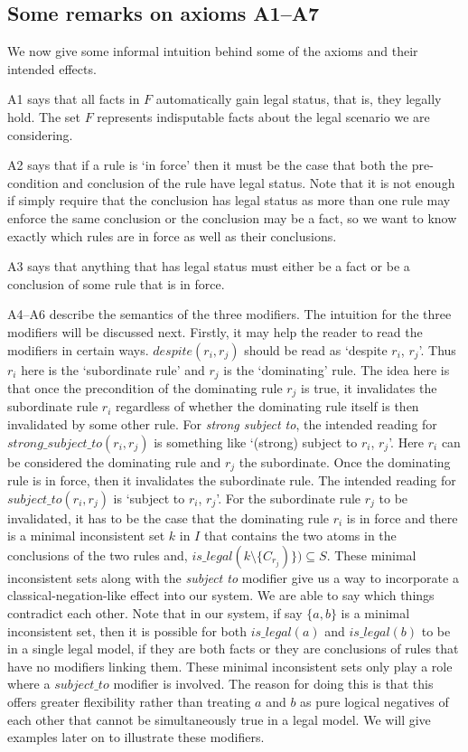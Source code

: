 \subsection{Some remarks on axioms A1--A7}
We now give some informal intuition behind some of the axioms and their intended effects.

A1 says that all facts in $F$ automatically gain legal status, that is, they legally hold. The set $F$ represents indisputable facts about the legal scenario we are considering.

A2 says that if a rule is `in force' then it must be the case that both the pre-condition and conclusion of the rule have legal status. Note that it is not enough if simply require that the conclusion has legal status as more than one rule may enforce the same conclusion or the conclusion may be a fact, so we want to know exactly which rules are in force as well as their conclusions.

A3 says that anything that has legal status must either be a fact or be a conclusion of some rule that is in force.

A4--A6 describe the semantics of the three modifiers. The intuition for the three modifiers will be discussed next. Firstly, it may help the reader to read the modifiers in certain ways. $despite(r_{i},r_{j})$ should be read as `despite $r_{i}$, $r_{j}$'. Thus $r_{i}$ here is the `subordinate rule' and $r_{j}$ is the `dominating' rule. The idea here is that once the precondition of the dominating rule $r_{j}$ is true, it invalidates the subordinate rule $r_{i}$ regardless of whether the dominating rule itself is then invalidated by some other rule. For \textit{strong subject to}, the intended reading for $strong\_subject\_to(r_{i},r_{j})$ is something like `(strong) subject to $r_{i}$, $r_{j}$'. Here $r_{i}$ can be considered the dominating rule and $r_{j}$ the subordinate. Once the dominating rule is in force, then it invalidates the subordinate rule. The intended reading for $subject\_to(r_{i},r_{j})$ is `subject to $r_{i}$, $r_{j}$'. For the subordinate rule $r_{j}$ to be invalidated, it has to be the case that the dominating rule $r_{i}$ is in force and there is a minimal inconsistent set $k$ in $I$ that contains the two atoms in the conclusions of the two rules and, $is\_legal(k\setminus \{C_{r_{j}})\})\subseteq S $. These minimal inconsistent sets along with the \textit{subject to} modifier give us a way to incorporate a classical-negation-like effect into our system. We are able to say which things contradict each other. Note that in our system, if say $\{a,b\}$ is a minimal inconsistent set, then it is possible for both $is\_legal(a)$ and $is\_legal(b)$ to be in a single legal model, if they are both facts or they are conclusions of rules that have no modifiers linking them. These minimal inconsistent sets only play a role where a $subject\_to$ modifier is involved. The reason for doing this is that this offers greater flexibility rather than treating $a$ and $b$ as pure logical negatives of each other that cannot be simultaneously true in a legal model. We will give examples later on to illustrate these modifiers.

